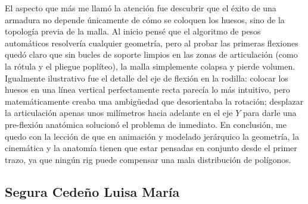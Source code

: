 El aspecto que más me llamó la atención fue descubrir que el éxito de una armadura no depende únicamente de cómo se coloquen los huesos, sino de la topología previa de la malla. Al inicio pensé que el algoritmo de pesos automáticos resolvería cualquier geometría, pero al probar las primeras flexiones quedó claro que sin bucles de soporte limpios en las zonas de articulación (como la rótula y el pliegue poplíteo), la malla simplemente colapsa y pierde volumen. Igualmente ilustrativo fue el detalle del eje de flexión en la rodilla: colocar los huesos en una línea vertical perfectamente recta parecía lo más intuitivo, pero matemáticamente creaba una ambigüedad que desorientaba la rotación; desplazar la articulación apenas unos milímetros hacia adelante en el eje $Y$ para darle una pre-flexión anatómica solucionó el problema de inmediato. En conclusión, me quedo con la lección de que en animación y modelado jerárquico la geometría, la cinemática y la anatomía tienen que estar pensadas en conjunto desde el primer trazo, ya que ningún rig puede compensar una mala distribución de polígonos.

\subsection{Segura Cedeño Luisa María}
